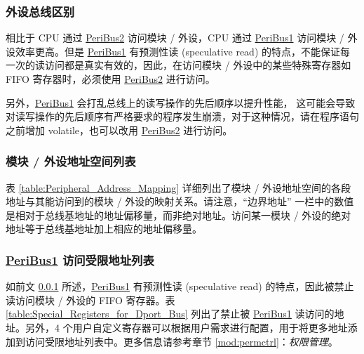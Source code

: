 \documentclass[main\_\_CN.tex]{subfiles}
\begin{document}
\subsubsection{外设总线区别}\label{differences_between_buses}

相比于 CPU 通过   \hyperref[PeripheralBus2]{PeriBus2}  访问模块 / 外设，CPU 通过  \hyperref[PeripheralBus1]{PeriBus1}  访问模块 / 外设效率更高。但是 \hyperref[PeripheralBus1]{PeriBus1} 有预测性读 (speculative read) 的特点，不能保证每一次的读访问都是真实有效的，因此，在访问模块 / 外设中的某些特殊寄存器如 FIFO 寄存器时，必须使用   \hyperref[PeripheralBus2]{PeriBus2}  进行访问。

另外，\hyperref[PeripheralBus1]{PeriBus1} 会打乱总线上的读写操作的先后顺序以提升性能， 这可能会导致对读写操作的先后顺序有严格要求的程序发生崩溃，对于这种情况，请在程序语句之前增加 volatile，也可以改用  \hyperref[PeripheralBus2]{PeriBus2}  进行访问。

\subsubsection{模块 / 外设地址空间列表}

表 \ref{table:Peripheral_Address_Mapping} 详细列出了模块 / 外设地址空间的各段地址与其能访问到的模块 / 外设的映射关系。请注意，“边界地址” 一栏中的数值是相对于总线基地址的地址偏移量，而非绝对地址。访问某一模块 / 外设的绝对地址等于总线基地址加上相应的地址偏移量。



\subsubsection{\hyperref[PeripheralBus1]{PeriBus1} 访问受限地址列表} \label{special register inside peripherals}

如前文 \ref{differences_between_buses} 所述，\hyperref[PeripheralBus1]{PeriBus1} 有预测性读 (speculative read) 的特点，因此被禁止读访问模块 / 外设的 FIFO 寄存器。表 \ref{table:Special_Registers_for_Dport_Bus} 列出了禁止被 \hyperref[PeripheralBus1]{PeriBus1} 读访问的地址。另外，4 个用户自定义寄存器可以根据用户需求进行配置，用于将更多地址添加到访问受限地址列表中。更多信息请参考章节 \ref{mod:permctrl}：\textit{权限管理}。


\end{document}
